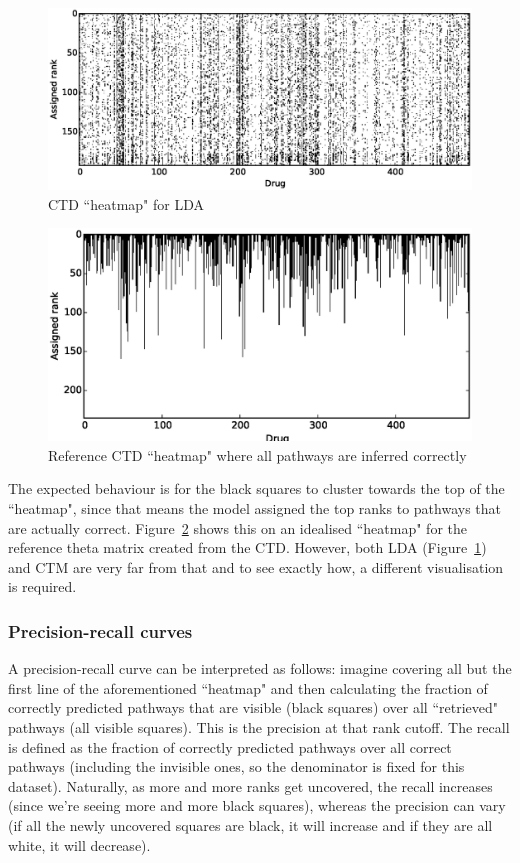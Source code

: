 \documentclass[12pt,a4paper,twoside,openright]{report}
\begin{document}
\begin{figure}[!htb]
\includegraphics[width=\textwidth]{lda-ctd-heatmap.eps}
\caption{CTD ``heatmap" for LDA}
\label{fig:lda-ctd-heatmap}
\end{figure}

\begin{figure}[!htb]
\includegraphics[width=\textwidth]{ref-ctd-heatmap.eps}
\caption{Reference CTD ``heatmap" where all pathways are inferred correctly}
\label{fig:ref-ctd-heatmap}
\end{figure}

The expected behaviour is for the black squares to cluster towards the top of the ``heatmap", since that means the model assigned the top ranks to pathways that are actually correct. Figure~\ref{fig:ref-ctd-heatmap} shows this on an idealised ``heatmap" for the reference theta matrix created from the CTD. However, both LDA (Figure~\ref{fig:lda-ctd-heatmap}) and CTM are very far from that and to see exactly how, a different visualisation is required.

\subsubsection{Precision-recall curves}

A precision-recall curve can be interpreted as follows: imagine covering all but the first line of the aforementioned ``heatmap" and then calculating the fraction of correctly predicted pathways that are visible (black squares) over all ``retrieved" pathways (all visible squares). This is the precision at that rank cutoff. The recall is defined as the fraction of correctly predicted pathways over all correct pathways (including the invisible ones, so the denominator is fixed for this dataset). Naturally, as more and more ranks get uncovered, the recall increases (since we're seeing more and more black squares), whereas the precision can vary (if all the newly uncovered squares are black, it will increase and if they are all white, it will decrease).
\end{document}
